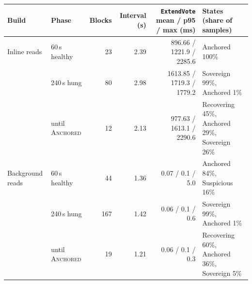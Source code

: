\begin{tabular}{@{}llrrrl@{}}
\toprule
\textbf{Build} & \textbf{Phase} & \textbf{Blocks} & \textbf{Interval (s)} & \texttt{ExtendVote} mean / p95 / max (ms) & \textbf{States (share of samples)} \\
\midrule
Inline reads & 60\,s healthy & 23 & 2.39 & 896.66 / 1221.9 / 2285.6 & Anchored 100\% \\
 & 240\,s hung & 80 & 2.98 & 1613.85 / 1719.3 / 1779.2 & Sovereign 99\%, Anchored 1\% \\
 & until \textsc{Anchored} & 12 & 2.13 & 977.63 / 1613.1 / 2290.6 & Recovering 45\%, Anchored 29\%, Sovereign 26\% \\
\midrule
Background reads & 60\,s healthy & 44 & 1.36 & 0.07 / 0.1 / 5.0 & Anchored 84\%, Suspicious 16\% \\
 & 240\,s hung & 167 & 1.42 & 0.06 / 0.1 / 0.6 & Sovereign 99\%, Anchored 1\% \\
 & until \textsc{Anchored} & 19 & 1.21 & 0.06 / 0.1 / 0.3 & Recovering 60\%, Anchored 36\%, Sovereign 5\% \\
\bottomrule
\end{tabular}
